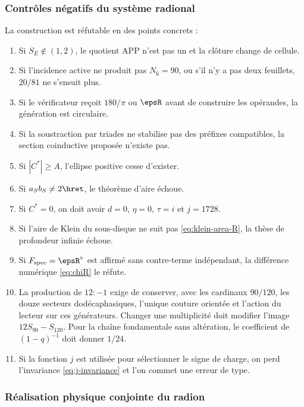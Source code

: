 \subsubsection{Contrôles négatifs du système radional}

La construction est réfutable en des points concrets :
\begin{enumerate}
\item Si \(S_E\notin(1,2)\), le quotient APP n'est pas un et la clôture change de
cellule.
\item Si l'incidence active ne produit pas \(N_6=90\), ou s'il n'y a pas deux feuillets,
\(20/81\) ne s'ensuit plus.
\item Si le vérificateur reçoit \(180/\pi\) ou \(\epsR\) avant de construire les
opérandes, la génération est circulaire.
\item Si la soustraction par triades ne stabilise pas des préfixes compatibles, la
section coinductive proposée n'existe pas.
\item Si \(|C^*|\ge A\), l'ellipse positive cesse d'exister.
\item Si \(a_Sb_S\ne2\hret\), le théorème d'aire échoue.
\item Si \(C^*=0\), on doit avoir \(d=0\), \(\eta=0\), \(\tau=i\) et
\(j=1728\).
\item Si l'aire de Klein du sous-disque ne suit pas \eqref{eq:klein-area-R}, la
thèse de profondeur infinie échoue.
\item Si \(F_{\mathrm{spec}}=\epsR^\circ\) est affirmé sans contre-terme indépendant, la
différence numérique \eqref{eq:chiR} le réfute.
\item La production de \(12:-1\) exige de conserver, avec les cardinaux
\(90/120\), les douze secteurs dodécaphasiques, l'unique couture orientée et
l'action du lecteur sur ces générateurs. Changer une multiplicité
doit modifier l'image \(12S_{90}-S_{120}\). Pour la chaîne fondamentale
sans altération, le coefficient de \((1-q)^{-1}\) doit donner \(1/24\).
\item Si la fonction \(j\) est utilisée pour sélectionner le signe de charge, on perd
l'invariance \eqref{eq:j-invariance} et l'on commet une erreur de type.
\end{enumerate}

\subsubsection{Réalisation physique conjointe du radion}

